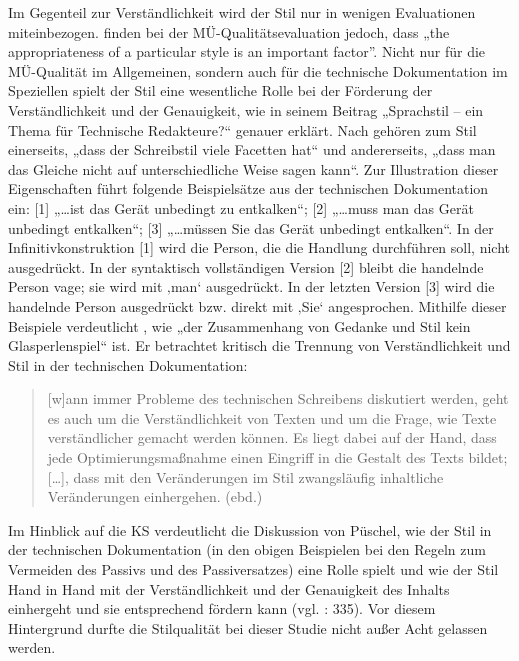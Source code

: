 Im Gegenteil zur Verständlichkeit wird der Stil nur in wenigen Evaluationen miteinbezogen. \citet[164]{HutchinsSomers1992} finden bei der MÜ-Qua\-li\-täts\-e\-va\-lua\-tion jedoch, dass „the appropriateness of a particular style is an important factor”. Nicht nur für die MÜ-Qualität im Allgemeinen, sondern auch für die technische Dokumentation im Speziellen spielt der Stil eine wesentliche Rolle bei der Förderung der Verständlichkeit und der Genauigkeit, wie \citet[307ff.]{Püschel1996} in seinem Beitrag „Sprachstil -- ein Thema für Technische Redakteure?“ genauer erklärt. Nach \citet[307]{Püschel1996} gehören zum Stil einerseits, „dass der Schreibstil viele Facetten hat“ und andererseits, „dass man das Gleiche nicht auf unterschiedliche Weise sagen kann“. Zur Illustration dieser Eigenschaften führt \citet[317]{Püschel1996} folgende Beispielsätze aus der technischen Dokumentation ein: [1] „\ldots ist das Gerät unbedingt zu entkalken“; [2] „\ldots muss man das Gerät unbedingt entkalken“; [3] „\ldots müssen Sie das Gerät unbedingt entkalken“. In der Infinitivkonstruktion [1] wird die Person, die die Handlung durchführen soll, nicht ausgedrückt. In der syntaktisch vollständigen Version [2] bleibt die handelnde Person vage; sie wird mit ‚man‘ ausgedrückt. In der letzten Version [3] wird die handelnde Person ausgedrückt bzw. direkt mit ‚Sie‘ angesprochen. Mithilfe dieser Beispiele verdeutlicht \citet[317]{Püschel1996}, wie „der Zusammenhang von Gedanke und Stil kein Glasperlenspiel“ ist. Er betrachtet kritisch die Trennung von Verständlichkeit und Stil in der technischen Dokumentation:

\begin{quote}
[w]ann immer Probleme des technischen Schreibens diskutiert werden, geht es auch um die Verständlichkeit von Texten und um die Frage, wie Texte verständlicher gemacht werden können. Es liegt dabei auf der Hand, dass jede Optimierungsmaßnahme einen Eingriff in die Gestalt des Texts bildet; [\ldots], dass mit den Veränderungen im Stil zwangsläufig inhaltliche Veränderungen einhergehen. (ebd.)
\end{quote}

Im Hinblick auf die KS verdeutlicht die Diskussion von Püschel, wie der Stil in der technischen Dokumentation (in den obigen Beispielen bei den Regeln zum Vermeiden des Passivs und des Passiversatzes) eine Rolle spielt und wie der Stil Hand in Hand mit der Verständlichkeit und der Genauigkeit des Inhalts einhergeht und sie entsprechend fördern kann (vgl. \citealt{Püschel1996}: 335). Vor diesem Hintergrund durfte die Stilqualität bei dieser Studie nicht außer Acht gelassen werden.

